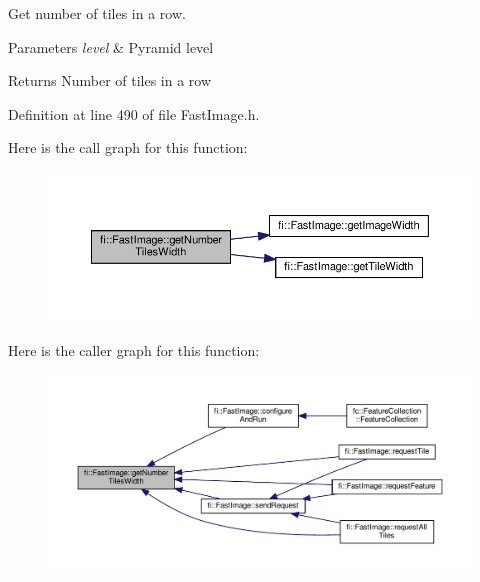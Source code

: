 Get number of tiles in a row. 


\begin{DoxyParams}{Parameters}
{\em level} & Pyramid level \\
\hline
\end{DoxyParams}
\begin{DoxyReturn}{Returns}
Number of tiles in a row 
\end{DoxyReturn}


Definition at line 490 of file Fast\+Image.\+h.

Here is the call graph for this function\+:
\nopagebreak
\begin{figure}[H]
\begin{center}
\leavevmode
\includegraphics[width=350pt]{dc/d6b/classfi_1_1FastImage_a5bb1377a075185ce8445b1dcb6886b6e_cgraph}
\end{center}
\end{figure}
Here is the caller graph for this function\+:
\nopagebreak
\begin{figure}[H]
\begin{center}
\leavevmode
\includegraphics[width=350pt]{dc/d6b/classfi_1_1FastImage_a5bb1377a075185ce8445b1dcb6886b6e_icgraph}
\end{center}
\end{figure}
\mbox{\label{classfi_1_1FastImage_a17a18b7839a4fd6f8b1cfd2253983bd5}} 
